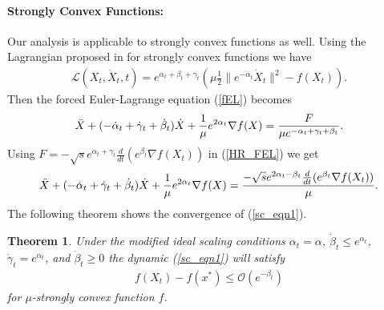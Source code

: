 \documentclass{article}
\theoremstyle{plain}
\newtheorem{thm}{\textbf{Theorem}}
\theoremstyle{definition}
\theoremstyle{remark}
\begin{document}
\paragraph{Strongly Convex Functions:} Our analysis is applicable to strongly convex functions as well. Using the Lagrangian proposed in \cite{wilson2021lyapunov} for strongly convex functions we have
\begin{align}\label{strongly_cvx_lagrange}
    \mathcal{L}(X_t,\dot X_t,t)=e^{\alpha_t+\beta_t+\gamma_t}(\mu \frac{1}{2}\|e^{-\alpha_t}\dot X_t\|^2-f(X_t)).
\end{align}
Then the forced Euler-Lagrange equation (\ref{fEL}) becomes
\begin{align}\label{HR_FEL}
    \Ddot{X}+(-\dot \alpha_t + \dot 
 \gamma_t+ \dot \beta_t)\dot X+\frac{1}{\mu}e^{2\alpha_t}\nabla f(X)=\frac{F}{\mu e^{-\alpha_t + \gamma_t + \beta_t}}.
\end{align}
Using $F=-\sqrt{s}e^{\alpha_t+\gamma_t}\frac{d}{dt}(e^{\beta_t}\nabla f(X_t))$ in (\ref{HR_FEL})
we get
\begin{align}\label{sc_eqn1}
    \Ddot{X}+(-\dot \alpha_t + \dot 
 \gamma_t+ \dot \beta_t)\dot X+\frac{1}{\mu}e^{2\alpha_t}\nabla f(X)=\frac{-\sqrt{s}e^{2\alpha_t-\beta_t}\frac{d}{dt}(e^{\beta_t}\nabla f(X_t))}{\mu }.
\end{align}
The following theorem shows the convergence of (\ref{sc_eqn1}).
\begin{thm}\label{Theorem3_1}
    Under the modified ideal scaling conditions $\alpha_t=\alpha$, $\dot \beta_t\leq e^{\alpha_t}$, $\dot \gamma_t=e^{\alpha_t}$, and $\dot \beta_t\geq 0$ the dynamic (\ref{sc_eqn1}) will satisfy
    \begin{align}\label{Theorem32_eqn1}
      f(X_t)-f(x^*)\leq \mathcal{O}(e^{-\beta_t})  
    \end{align}
    for $\mu$-strongly convex function $f$.
\end{thm}
\end{document}

